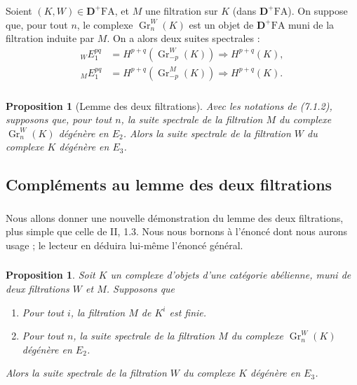 \documentclass[11pt]{amsart}
\theoremstyle{plain}
\newtheorem{proposition}[theorem]{Proposition}
\theoremstyle{definition}
\DeclareMathOperator{\Gr}{Gr}
\newcommand{\DD}{\mathbf{D}}
\begin{document}
\subsubsection{}
Soient $(K, W) \in \DD^+ \mathrm{FA}$, et $M$ une filtration sur $K$ (dans $\DD^+ \mathrm{FA}$). On suppose que, pour tout $n$, le complexe $\Gr_n^W(K)$ est un objet de $\DD^+ \mathrm{FA}$ muni de la filtration induite par $M$. On a alors deux suites spectrales :
\begin{align}
{}_W E_1^{pq} &= H^{p+q}(\Gr_{-p}^W(K)) \Rightarrow H^{p+q}(K), \label{eq:7.1.2a} \\
{}_M E_1^{pq} &= H^{p+q}(\Gr_{-p}^M(K)) \Rightarrow H^{p+q}(K). \label{eq:7.1.2b}
\end{align}

\subsubsection{}
\begin{proposition}[Lemme des deux filtrations]
Avec les notations de \emph{(7.1.2)}, supposons que, pour tout $n$, la suite spectrale de la filtration $M$ du complexe $\Gr_n^W(K)$ d\'eg\'en\`ere en $E_2$. Alors la suite spectrale de la filtration $W$ du complexe $K$ d\'eg\'en\`ere en $E_3$.
\end{proposition}

\subsection{Compl\'ements au lemme des deux filtrations}

\subsubsection{}
Nous allons donner une nouvelle d\'emonstration du lemme des deux filtrations, plus simple que celle de II, 1.3. Nous nous bornons \`a l'\'enonc\'e dont nous aurons usage ; le lecteur en d\'eduira lui-m\^eme l'\'enonc\'e g\'en\'eral.

\subsubsection{}
\begin{proposition}
Soit $K$ un complexe d'objets d'une cat\'egorie ab\'elienne, muni de deux filtrations $W$ et $M$. Supposons que
\begin{enumerate}
\item[(i)] Pour tout $i$, la filtration $M$ de $K^i$ est finie.
\item[(ii)] Pour tout $n$, la suite spectrale de la filtration $M$ du complexe $\Gr_n^W(K)$ d\'eg\'en\`ere en $E_2$.
\end{enumerate}
Alors la suite spectrale de la filtration $W$ du complexe $K$ d\'eg\'en\`ere en $E_3$.
\end{proposition}
\end{document}
